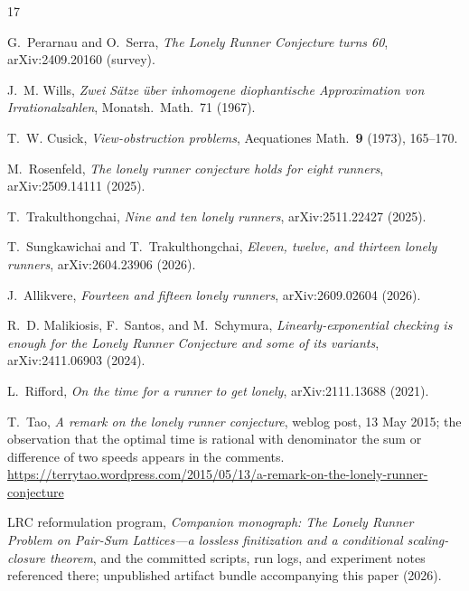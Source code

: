 
\begingroup\sloppy\raggedright
\begin{thebibliography}{17}

G.~Perarnau and O.~Serra,
\emph{The Lonely Runner Conjecture turns 60},
arXiv:2409.20160 (survey).

J.~M. Wills,
\emph{Zwei S\"atze \"uber inhomogene diophantische Approximation von
Irrationalzahlen},
Monatsh.\ Math.\ 71 (1967).

T.~W. Cusick,
\emph{View-obstruction problems},
Aequationes Math.\ \textbf{9} (1973), 165--170.

M.~Rosenfeld,
\emph{The lonely runner conjecture holds for eight runners},
arXiv:2509.14111 (2025).

T.~Trakulthongchai,
\emph{Nine and ten lonely runners},
arXiv:2511.22427 (2025).

T.~Sungkawichai and T.~Trakulthongchai,
\emph{Eleven, twelve, and thirteen lonely runners},
arXiv:2604.23906 (2026).

J.~Allikvere,
\emph{Fourteen and fifteen lonely runners},
arXiv:2609.02604 (2026).

R.~D. Malikiosis, F.~Santos, and M.~Schymura,
\emph{Linearly-exponential checking is enough for the Lonely Runner
Conjecture and some of its variants},
arXiv:2411.06903 (2024).

L.~Rifford,
\emph{On the time for a runner to get lonely},
arXiv:2111.13688 (2021).

T.~Tao,
\emph{A remark on the lonely runner conjecture},
weblog post, 13 May 2015; the observation that the optimal time is
rational with denominator the sum or difference of two speeds appears
in the comments.
\\[2pt]
\url{https://terrytao.wordpress.com/2015/05/13/a-remark-on-the-lonely-runner-conjecture}

LRC reformulation program,
\emph{Companion monograph: The Lonely Runner Problem on Pair-Sum
Lattices---a lossless finitization and a conditional scaling-closure
theorem}, and the committed scripts, run logs, and experiment notes
referenced there; unpublished artifact bundle accompanying this paper
(2026).


\end{thebibliography}
